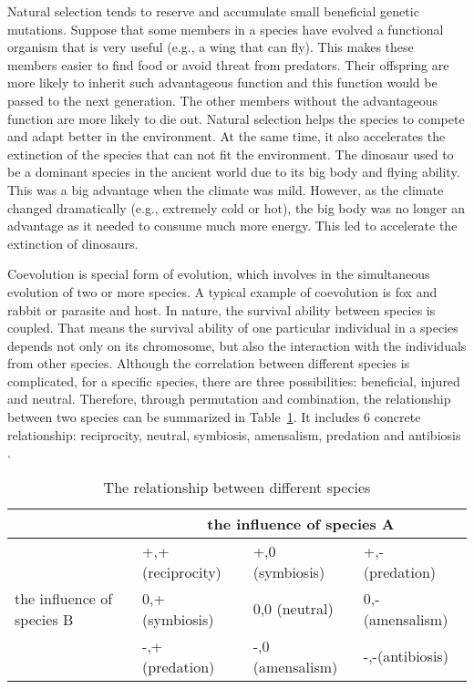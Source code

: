 Natural selection tends to reserve and accumulate small beneficial genetic mutations. Suppose that some members in a species have evolved a functional organism that is very useful (e.g., a wing that can fly). This makes these members easier to find food or avoid threat from predators. Their offspring are more likely to inherit such advantageous function and this function would be passed to the next generation. The other members without the advantageous function are more likely to die out. Natural selection helps the species to compete and adapt better in the environment. At the same time, it also accelerates the extinction of the species that can not fit the environment. The dinosaur used to be a dominant species in the ancient world due to its big body and flying ability. This was a big advantage when the climate was mild. However, as the climate changed dramatically (e.g., extremely cold or hot), the big body was no longer an advantage as it needed to consume much more energy. This led to accelerate the extinction of dinosaurs. 

Coevolution is special form of evolution, which involves in the simultaneous evolution of two or more species. A typical example of coevolution is fox and rabbit or parasite and host. In nature, the survival ability between species is coupled. That means the survival ability of one particular individual in a species depends not only on its chromosome, but also the interaction with the individuals from other species. Although the correlation between different species is complicated, for a specific species, there are three possibilities: beneficial, injured and neutral. Therefore, through permutation and combination, the relationship between two species can be summarized in Table~\ref{tab:relationship_species_coevolution}. It includes 6 concrete relationship: reciprocity, neutral, symbiosis, amensalism, predation and antibiosis \cite{BiLi2009}.

\begin{table}[!t]          
  \centering                     
  \caption{The relationship between different species}
  \label{tab:relationship_species_coevolution} 
  \renewcommand{\arraystretch}{1.5}
  \begin{tabularx}{400pt}{l|l|l|l}                                                    
    \hline                                                                %
     & \multicolumn{3}{c}{the influence of species A } \\                       %
    \hline
    & +,+ (reciprocity)  & +,0 (symbiosis)   & +,- (predation)   \\
    the influence of species B & 0,+ (symbiosis) & 0,0 (neutral) & 0,- (amensalism)  \\
    & -,+ (predation)    & -,0 (amensalism) & -,-(antibiosis) \\
    \hline
  \end{tabularx}
\end{table}

